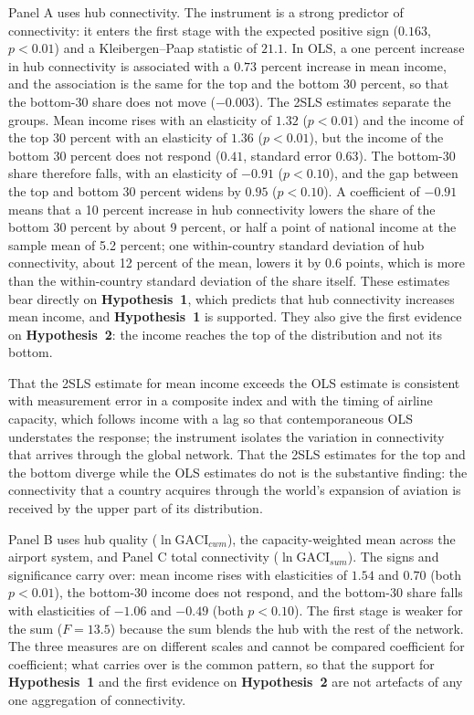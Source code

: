 Panel A uses hub connectivity. The instrument is a strong predictor of connectivity: it enters the first stage with the expected positive sign ($0.163$, $p<0.01$) and a Kleibergen--Paap statistic of $21.1$. In OLS, a one percent increase in hub connectivity is associated with a $0.73$ percent increase in mean income, and the association is the same for the top and the bottom 30 percent, so that the bottom-30 share does not move ($-0.003$). The 2SLS estimates separate the groups. Mean income rises with an elasticity of $1.32$ ($p<0.01$) and the income of the top 30 percent with an elasticity of $1.36$ ($p<0.01$), but the income of the bottom 30 percent does not respond ($0.41$, standard error $0.63$). The bottom-30 share therefore falls, with an elasticity of $-0.91$ ($p<0.10$), and the gap between the top and bottom 30 percent widens by $0.95$ ($p<0.10$). A coefficient of $-0.91$ means that a 10 percent increase in hub connectivity lowers the share of the bottom 30 percent by about 9 percent, or half a point of national income at the sample mean of 5.2 percent; one within-country standard deviation of hub connectivity, about 12 percent of the mean, lowers it by 0.6 points, which is more than the within-country standard deviation of the share itself. These estimates bear directly on \textbf{Hypothesis~1}, which predicts that hub connectivity increases mean income, and \textbf{Hypothesis~1} is supported. They also give the first evidence on \textbf{Hypothesis~2}: the income reaches the top of the distribution and not its bottom.

That the 2SLS estimate for mean income exceeds the OLS estimate is consistent with measurement error in a composite index and with the timing of airline capacity, which follows income with a lag so that contemporaneous OLS understates the response; the instrument isolates the variation in connectivity that arrives through the global network. That the 2SLS estimates for the top and the bottom diverge while the OLS estimates do not is the substantive finding: the connectivity that a country acquires through the world's expansion of aviation is received by the upper part of its distribution.

Panel B uses hub quality ($\ln\mathrm{GACI}_{cwm}$), the capacity-weighted mean across the airport system, and Panel C total connectivity ($\ln\mathrm{GACI}_{sum}$). The signs and significance carry over: mean income rises with elasticities of $1.54$ and $0.70$ (both $p<0.01$), the bottom-30 income does not respond, and the bottom-30 share falls with elasticities of $-1.06$ and $-0.49$ (both $p<0.10$). The first stage is weaker for the sum ($F=13.5$) because the sum blends the hub with the rest of the network. The three measures are on different scales and cannot be compared coefficient for coefficient; what carries over is the common pattern, so that the support for \textbf{Hypothesis~1} and the first evidence on \textbf{Hypothesis~2} are not artefacts of any one aggregation of connectivity.

